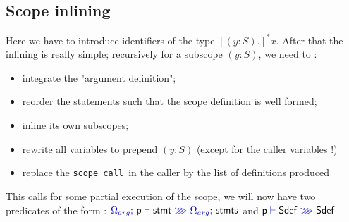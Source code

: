 \documentclass[11pt,a4paper]{article}
\newcommand{\synvar}[1]{\ensuremath{#1}}
\newcommand{\synkeyword}[1]{\textcolor{red!60!black}{\texttt{#1}}}
\newcommand{\synname}[1]{\ensuremath{\mathsf{#1}}}
\newcommand{\synscopecall}{\synkeyword{scope\_call~}}
\newcommand{\synscope}[2]{\synvar{(#1:#2)}}
\newcommand{\exctx}[1]{\textcolor{blue!80!black}{\ensuremath{#1}}}
\newcommand{\Omegaarg}{\Omega_{arg}}
\newcommand{\exvdash}{\;\exctx{\vdash}\;}
\newcommand{\exsemicolon}{\exctx{;~}}
\begin{document}
\subsection{Scope inlining}

Here we have to introduce identifiers of the type $[\synscope{y}{S}.]^*\synvar{x}$. 
After that the inlining is really simple; recursively for a subscope \synscope{y}{S}, we need to :
\begin{itemize}
  \item integrate the "argument definition";
  \item reorder the statements such that the scope definition is well formed;
  \item inline its own subscopes;
  \item rewrite all variables to prepend \synscope{y}{S} (except for the caller variables !)
  \item replace the \synscopecall in the caller by the list of definitions produced
\end{itemize}

\newcommand{\exinline}{\exctx{\;\ggg\;}}

This calls for some partial execution of the scope, we will now have two predicates of the form : $\exctx{\Omegaarg}\exsemicolon\synname{p}\exvdash\synname{stmt}\exinline\exctx{\Omegaarg}\exsemicolon\synname{stmts}$ and $\synname{p}\exvdash\synname{Sdef}\exinline\synname{Sdef}$
\end{document}
